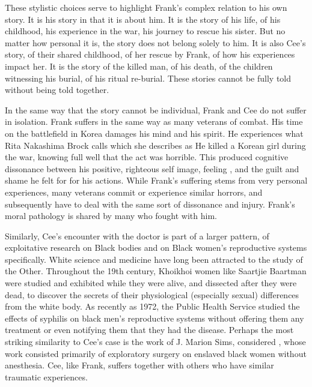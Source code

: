 \documentclass[12pt]{article}
\begin{document}
These stylistic choices serve to highlight Frank's complex relation to his own
story. It is his story in that it is about him. It is the story of his life, of
his childhood, his experience in the war, his journey to rescue his sister. But
no matter how personal it is, the story does not belong solely to him. It is
also Cee's story, of their shared childhood, of her rescue by Frank, of how his
experiences impact her. It is the story of the killed man, of his death, of the
children witnessing his burial, of his ritual re-burial. These stories cannot
be fully told without being told together.

In the same way that the story cannot be individual, Frank and Cee do not
suffer in isolation. Frank suffers in the same way as many veterans of combat.
His time on the battlefield in Korea damages his mind and his spirit. He
experiences what Rita Nakashima Brock calls  which she
describes as \autocite{moral-injury}
He killed a Korean girl during the war, knowing full well that the act was
horrible. This produced cognitive dissonance between his positive, righteous
self image, feeling ,\autocite[p. 133]{home} and the guilt and shame he felt for for his
actions. While Frank's suffering stems from very personal experiences, many
veterans commit or experience similar horrors, and subsequently have to deal
with the same sort of dissonance and injury. Frank's moral pathology is shared
by many who fought with him.

Similarly, Cee's encounter with the doctor is part of a larger pattern, of
exploitative research on Black bodies and on Black women's reproductive systems
specifically. White science and medicine have long been attracted to the study
of the Other. Throughout the 19th century, Khoikhoi women like Saartjie
Baartman were studied and exhibited while they were alive, and dissected after
they were dead, to discover the secrets of their physiological (especially
sexual) differences from the white body.\autocite{sara} As recently as 1972,
the Public Health Service studied the effects of syphilis on black men's
reproductive systems without offering them any treatment or even notifying them
that they had the disease. Perhaps the most striking similarity to Cee's case
is the work of J. Marion Sims, considered , whose work consisted primarily of exploratory surgery on enslaved
black women without anesthesia.\autocite{sims} Cee, like Frank, suffers
together with others who have similar traumatic experiences.
\end{document}

